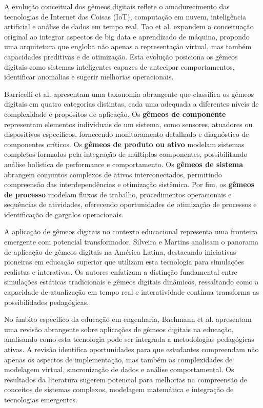 \documentclass[12pt,a4paper]{article}
\begin{document}
A evolução conceitual dos gêmeos digitais reflete o amadurecimento das tecnologias de Internet das Coisas (IoT), computação em nuvem, inteligência artificial e análise de dados em tempo real. Tao et al. \cite{tao2018} expandem a conceituação original ao integrar aspectos de big data e aprendizado de máquina, propondo uma arquitetura que engloba não apenas a representação virtual, mas também capacidades preditivas e de otimização. Esta evolução posiciona os gêmeos digitais como sistemas inteligentes capazes de antecipar comportamentos, identificar anomalias e sugerir melhorias operacionais.

Barricelli et al. \cite{barricelli2019} apresentam uma taxonomia abrangente que classifica os gêmeos digitais em quatro categorias distintas, cada uma adequada a diferentes níveis de complexidade e propósitos de aplicação. Os \textbf{gêmeos de componente} representam elementos individuais de um sistema, como sensores, atuadores ou dispositivos específicos, fornecendo monitoramento detalhado e diagnóstico de componentes críticos. Os \textbf{gêmeos de produto ou ativo} modelam sistemas completos formados pela integração de múltiplos componentes, possibilitando análise holística de performance e comportamento. Os \textbf{gêmeos de sistema} abrangem conjuntos complexos de ativos interconectados, permitindo compreensão das interdependências e otimização sistêmica. Por fim, os \textbf{gêmeos de processo} modelam fluxos de trabalho, procedimentos operacionais e sequências de atividades, oferecendo oportunidades de otimização de processos e identificação de gargalos operacionais.

A aplicação de gêmeos digitais no contexto educacional representa uma fronteira emergente com potencial transformador. Silveira e Martins \cite{silveira2024panorama} analisam o panorama de aplicação de gêmeos digitais na América Latina, destacando iniciativas pioneiras em educação superior que utilizam esta tecnologia para simulações realistas e interativas. Os autores enfatizam a distinção fundamental entre simulações estáticas tradicionais e gêmeos digitais dinâmicos, ressaltando como a capacidade de atualização em tempo real e interatividade contínua transforma as possibilidades pedagógicas.

No âmbito específico da educação em engenharia, Bachmann et al. \cite{bachmann2023} apresentam uma revisão abrangente sobre aplicações de gêmeos digitais na educação, analisando como esta tecnologia pode ser integrada a metodologias pedagógicas ativas. A revisão identifica oportunidades para que estudantes compreendam não apenas os aspectos de implementação, mas também as complexidades de modelagem virtual, sincronização de dados e análise comportamental. Os resultados da literatura sugerem potencial para melhorias na compreensão de conceitos de sistemas complexos, modelagem matemática e integração de tecnologias emergentes.
\end{document}
